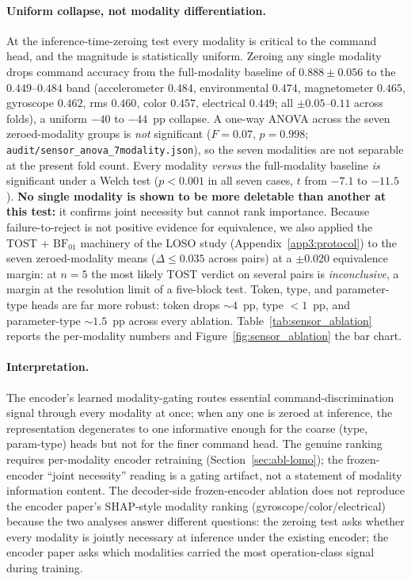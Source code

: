 \documentclass[sensors,article,submit,moreauthors,pdftex]{Definitions/mdpi}
\begin{document}
\paragraph{Uniform collapse, not modality differentiation.} At the inference-time-zeroing test every modality is critical to the command head, and the magnitude is statistically uniform. Zeroing any single modality drops command accuracy from the full-modality baseline of $0.888 \pm 0.056$ to the $0.449$--$0.484$ band (accelerometer $0.484$, environmental $0.474$, magnetometer $0.465$, gyroscope $0.462$, rms $0.460$, color $0.457$, electrical $0.449$; all $\pm 0.05$--$0.11$ across folds), a uniform $-40$ to $-44$~pp collapse. A one-way ANOVA across the seven zeroed-modality groups is \emph{not} significant ($F=0.07$, $p=0.998$; \texttt{audit/sensor\_anova\_7modality.json}), so the seven modalities are not separable at the present fold count. Every modality \emph{versus} the full-modality baseline \emph{is} significant under a Welch test ($p<0.001$ in all seven cases, $t$ from $-7.1$ to $-11.5$). \textbf{No single modality is shown to be more deletable than another at this test:} it confirms joint necessity but cannot rank importance. Because failure-to-reject is not positive evidence for equivalence, we also applied the TOST + $\mathrm{BF}_{01}$ machinery of the LOSO study (Appendix~\ref{app3:protocol}) to the seven zeroed-modality means ($\Delta\!\le\!0.035$ across pairs) at a $\pm 0.020$ equivalence margin: at $n\!=\!5$ the most likely TOST verdict on several pairs is \emph{inconclusive}, a margin at the resolution limit of a five-block test. Token, type, and parameter-type heads are far more robust: token drops $\sim 4$~pp, type $<1$~pp, and parameter-type $\sim 1.5$~pp across every ablation. Table~\ref{tab:sensor_ablation} reports the per-modality numbers and Figure~\ref{fig:sensor_ablation} the bar chart.




\paragraph{Interpretation.} The encoder's learned modality-gating routes essential command-discrimination signal through every modality at once; when any one is zeroed at inference, the representation degenerates to one informative enough for the coarse (type, param-type) heads but not for the finer command head. The genuine ranking requires per-modality encoder retraining (Section~\ref{sec:abl-lomo}); the frozen-encoder ``joint necessity'' reading is a gating artifact, not a statement of modality information content. The decoder-side frozen-encoder ablation does not reproduce the encoder paper's SHAP-style modality ranking (gyroscope/color/electrical) because the two analyses answer different questions: the zeroing test asks whether every modality is jointly necessary at inference under the existing encoder; the encoder paper asks which modalities carried the most operation-class signal during training.
\end{document}
